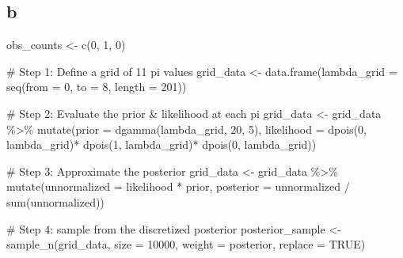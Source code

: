 \documentclass[
  letterpaper,
  DIV=11,
  numbers=noendperiod]{scrartcl}
\newenvironment{Shaded}{\begin{snugshade}}{\end{snugshade}}
\newcommand{\AttributeTok}[1]{\textcolor[rgb]{0.40,0.45,0.13}{#1}}
\newcommand{\CommentTok}[1]{\textcolor[rgb]{0.37,0.37,0.37}{#1}}
\newcommand{\ConstantTok}[1]{\textcolor[rgb]{0.56,0.35,0.01}{#1}}
\newcommand{\DecValTok}[1]{\textcolor[rgb]{0.68,0.00,0.00}{#1}}
\newcommand{\FunctionTok}[1]{\textcolor[rgb]{0.28,0.35,0.67}{#1}}
\newcommand{\NormalTok}[1]{\textcolor[rgb]{0.00,0.23,0.31}{#1}}
\newcommand{\OtherTok}[1]{\textcolor[rgb]{0.00,0.23,0.31}{#1}}
\newcommand{\SpecialCharTok}[1]{\textcolor[rgb]{0.37,0.37,0.37}{#1}}
\begin{document}
\hypertarget{b-5}{%
\subsection{b}\label{b-5}}

\begin{Shaded}
\begin{Highlighting}[]
\NormalTok{obs\_counts }\OtherTok{\textless{}{-}} \FunctionTok{c}\NormalTok{(}\DecValTok{0}\NormalTok{, }\DecValTok{1}\NormalTok{, }\DecValTok{0}\NormalTok{)}

\CommentTok{\# Step 1: Define a grid of 11 pi values}
\NormalTok{grid\_data }\OtherTok{\textless{}{-}} \FunctionTok{data.frame}\NormalTok{(}\AttributeTok{lambda\_grid =} \FunctionTok{seq}\NormalTok{(}\AttributeTok{from =} \DecValTok{0}\NormalTok{, }\AttributeTok{to =} \DecValTok{8}\NormalTok{, }
                                      \AttributeTok{length =} \DecValTok{201}\NormalTok{))}

\CommentTok{\# Step 2: Evaluate the prior \& likelihood at each pi}
\NormalTok{grid\_data }\OtherTok{\textless{}{-}}\NormalTok{ grid\_data }\SpecialCharTok{\%\textgreater{}\%} 
  \FunctionTok{mutate}\NormalTok{(}\AttributeTok{prior =} \FunctionTok{dgamma}\NormalTok{(lambda\_grid, }\DecValTok{20}\NormalTok{, }\DecValTok{5}\NormalTok{),}
         \AttributeTok{likelihood =} \FunctionTok{dpois}\NormalTok{(}\DecValTok{0}\NormalTok{, lambda\_grid)}\SpecialCharTok{*}
           \FunctionTok{dpois}\NormalTok{(}\DecValTok{1}\NormalTok{, lambda\_grid)}\SpecialCharTok{*}
           \FunctionTok{dpois}\NormalTok{(}\DecValTok{0}\NormalTok{, lambda\_grid))}

\CommentTok{\# Step 3: Approximate the posterior}
\NormalTok{grid\_data }\OtherTok{\textless{}{-}}\NormalTok{ grid\_data }\SpecialCharTok{\%\textgreater{}\%} 
  \FunctionTok{mutate}\NormalTok{(}\AttributeTok{unnormalized =}\NormalTok{ likelihood }\SpecialCharTok{*}\NormalTok{ prior,}
         \AttributeTok{posterior =}\NormalTok{ unnormalized }\SpecialCharTok{/} \FunctionTok{sum}\NormalTok{(unnormalized))}

\CommentTok{\# Step 4: sample from the discretized posterior}
\NormalTok{posterior\_sample }\OtherTok{\textless{}{-}} \FunctionTok{sample\_n}\NormalTok{(grid\_data, }
                             \AttributeTok{size =} \DecValTok{10000}\NormalTok{, }
                             \AttributeTok{weight =}\NormalTok{ posterior, }
                             \AttributeTok{replace =} \ConstantTok{TRUE}\NormalTok{)}


\end{Highlighting}
\end{Shaded}
\end{document}
